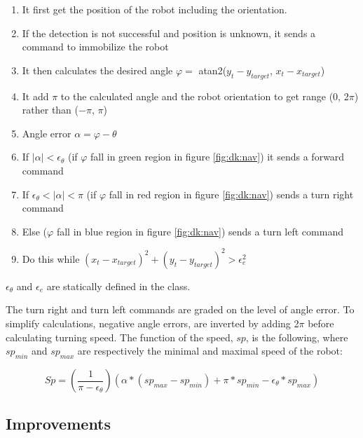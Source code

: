     \begin{enumerate}
        \item It first get the position of the robot including 
            the orientation. 
        \item If the detection is not successful and position is unknown, 
            it sends a command to immobilize the robot
        \item It then calculates the desired angle 
            $ \varphi = $
            atan2($y_{t}-y_{target}$, $x_{t}-x_{target}$)
        \item It add $\pi$ to the calculated angle and the robot orientation 
            to get range (0, 2$\pi$) rather than ($-\pi$, $\pi$)
        \item Angle error $\alpha = \varphi-\theta$ 
        \item If $|\alpha| < \epsilon_\theta$ (if $\varphi$ fall in green 
            region in figure 
            \ref{fig:dk:nav})
            it sends a forward command
        \item If $\epsilon_\theta < |\alpha| < \pi$ (if $\varphi$ fall in
            red region in figure \ref{fig:dk:nav})
            sends a turn right command
        \item Else ($\varphi$ fall in blue region in figure \ref{fig:dk:nav}) 
              sends a turn left command
        \item Do this while $(x_t-x_{target})^2+(y_t-y_{target})^2 > \epsilon_e^2$ 
    \end{enumerate}

$\epsilon_\theta$ and $\epsilon_e$ are statically defined in the class.

The turn right and turn left commands are graded on the level of angle 
error. To simplify calculations, negative angle errors,
are inverted by adding 
2$\pi$ before calculating turning speed. The function of the speed, $sp$, 
is the following, where $sp_{min}$ and $sp_{max}$ are respectively the
minimal and maximal speed of the robot:

\begin{displaymath}
    Sp = \left(\frac{1}{\pi-\epsilon_\theta}\right)\left(\alpha*(sp_{max}-sp_{min}) + 
\pi*sp_{min}-\epsilon_\theta*sp_{max}\right)
\end{displaymath}

\subsection{Improvements}
\label{sec:dk:improvements}

